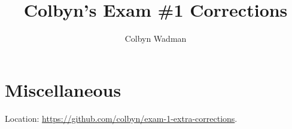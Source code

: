 \documentclass{article}
\title{Colbyn's Exam \#1 Corrections}
\author{Colbyn Wadman}
\begin{document}
\maketitle

 






\section*{Miscellaneous}
\begin{center}
    Location: \url{https://github.com/colbyn/exam-1-extra-corrections}.
\end{center}
\end{document}
